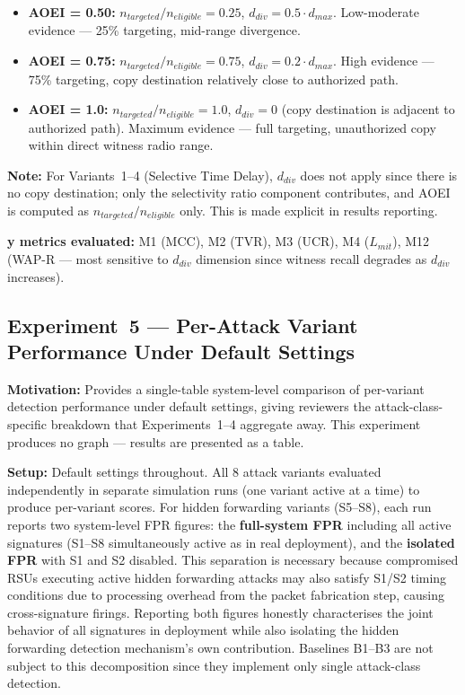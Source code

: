\documentclass[12pt, a4paper]{report}
\begin{document}
{{\begin{itemize}
    \item \textbf{AOEI = 0.50:}
    $n_{targeted}/n_{eligible} = 0.25$,
    $d_{div} = 0.5 \cdot d_{max}$.
    Low-moderate evidence — 25\% targeting,
    mid-range divergence.

    \item \textbf{AOEI = 0.75:}
    $n_{targeted}/n_{eligible} = 0.75$,
    $d_{div} = 0.2 \cdot d_{max}$.
    High evidence — 75\% targeting, copy
    destination relatively close to authorized path.

    \item \textbf{AOEI = 1.0:}
    $n_{targeted}/n_{eligible} = 1.0$,
    $d_{div} = 0$ (copy destination is adjacent
    to authorized path).
    Maximum evidence — full targeting, unauthorized
    copy within direct witness radio range.
\end{itemize}

\textbf{Note:} For Variants~1--4 (Selective Time
Delay), $d_{div}$ does not apply since there is
no copy destination; only the selectivity ratio
component contributes, and AOEI is computed as
$n_{targeted}/n_{eligible}$ only. This is made
explicit in results reporting.

\textbf{y metrics evaluated:}
M1 (MCC), M2 (TVR), M3 (UCR), M4 ($L_{mit}$),
M12 (WAP-R — most sensitive to $d_{div}$ dimension
since witness recall degrades as $d_{div}$ increases).



\subsection{Experiment~5 — Per-Attack Variant
Performance Under Default Settings}
\label{sec:exp5}

\textbf{Motivation:} Provides a single-table
system-level comparison of per-variant detection
performance under default settings, giving
reviewers the attack-class-specific breakdown
that Experiments~1--4 aggregate away. This
experiment produces no graph — results are
presented as a table.

\textbf{Setup:} Default settings throughout. All 8
attack variants evaluated independently in separate
simulation runs (one variant active at a time) to
produce per-variant scores. For hidden forwarding
variants (S5--S8), each run reports two system-level
\ac{FPR} figures: the \textbf{full-system \ac{FPR}}
including all active signatures (S1--S8 simultaneously
active as in real deployment), and the
\textbf{isolated \ac{FPR}} with S1 and S2 disabled.
This separation is necessary because compromised
\ac{RSU}s executing active hidden forwarding attacks
may also satisfy S1/S2 timing conditions due to
processing overhead from the packet fabrication step,
causing cross-signature firings. Reporting both
figures honestly characterises the joint behavior of
all signatures in deployment while also isolating the
hidden forwarding detection mechanism's own
contribution. Baselines B1--B3 are not subject to
this decomposition since they implement only single
attack-class detection.


}}
\end{document}
